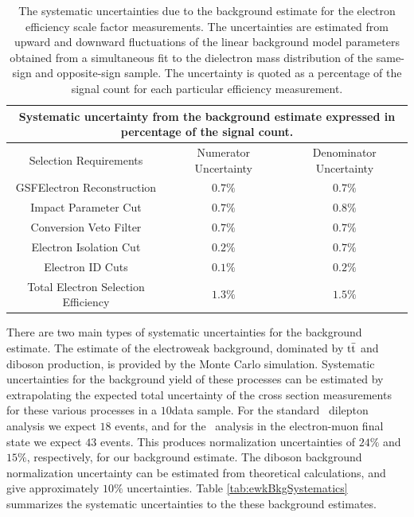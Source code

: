 \documentclass{cmspaper}
\begin{document}
\begin{table}[!ht]
\begin{center}
\begin{tabular}{|c|c|c|}
\hline
 \multicolumn{3}{|c|}{Systematic uncertainty from the background estimate expressed in percentage of the signal count.} \\
\hline
 Selection Requirements & Numerator Uncertainty & Denominator Uncertainty \\
\hline
\hline
 GSFElectron Reconstruction           & $ 0.7\%$  & $ 0.7\%$  \\
 Impact Parameter Cut                 & $ 0.7\%$  & $ 0.8\%$  \\
 Conversion Veto Filter               & $ 0.7\%$  & $ 0.7\%$  \\
 Electron Isolation Cut               & $ 0.2\%$  & $ 0.7\%$  \\
 Electron ID Cuts                     & $ 0.1\%$  & $ 0.2\%$  \\
\hline                               
 Total Electron Selection Efficiency  & $ 1.3\%$  & $ 1.5\%$  \\
\hline                               
\end{tabular}
\caption{The systematic uncertainties due to the background estimate for the electron efficiency scale factor measurements. The uncertainties are estimated from upward and downward fluctuations of the linear background model parameters obtained from a simultaneous fit to the dielectron mass distribution of the same-sign and opposite-sign sample. The uncertainty is quoted as a percentage of the signal count for each particular efficiency measurement. \label{tab:ElectronEfficiencySystematicsFromSSOSSimultaneousFit}}
\end{center}
\end{table}





There are two main types of systematic uncertainties for the background estimate. The estimate of the electroweak background, dominated by $\mathrm{t}\bar{\mathrm{t}}$ and diboson production, is provided by the Monte Carlo simulation. Systematic uncertainties for the background yield of these processes can be estimated by extrapolating the expected total uncertainty of the cross section measurements for these various processes in a $10$\ipb data sample. For the standard \ttbar\ dilepton analysis we expect $18$ events, and for the \Z\To\Taup\Taum\ analysis in the electron-muon final state we expect $43$ events. This produces normalization uncertainties of $24\%$ and $15\%$, respectively, for our background estimate. The diboson background normalization uncertainty can be estimated from theoretical calculations, and give approximately $10\%$ uncertainties. Table \ref{tab:ewkBkgSystematics} summarizes the systematic uncertainties to the these background estimates.
\end{document}
